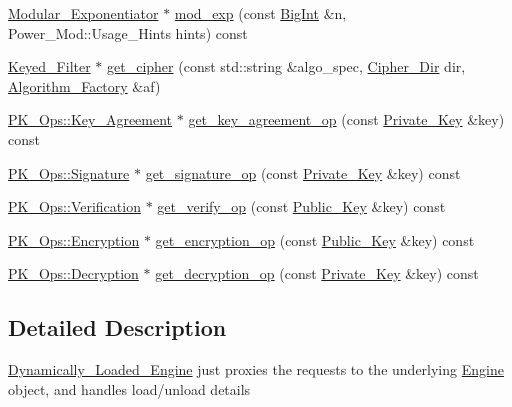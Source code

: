 \begin{DoxyCompactItemize}
\item 
\hyperlink{classBotan_1_1Modular__Exponentiator}{Modular\-\_\-\-Exponentiator} $\ast$ \hyperlink{classBotan_1_1Dynamically__Loaded__Engine_a759cf16bfc3f9f70b5e661e111d8608d}{mod\-\_\-exp} (const \hyperlink{classBotan_1_1BigInt}{Big\-Int} \&n, Power\-\_\-\-Mod\-::\-Usage\-\_\-\-Hints hints) const 
\item 
\hyperlink{classBotan_1_1Keyed__Filter}{Keyed\-\_\-\-Filter} $\ast$ \hyperlink{classBotan_1_1Dynamically__Loaded__Engine_a742a56b8bcf169bb028579279c7fba0d}{get\-\_\-cipher} (const std\-::string \&algo\-\_\-spec, \hyperlink{namespaceBotan_ad9d14ffdc73fc19966421979b32ee759}{Cipher\-\_\-\-Dir} dir, \hyperlink{classBotan_1_1Algorithm__Factory}{Algorithm\-\_\-\-Factory} \&af)
\item 
\hyperlink{classBotan_1_1PK__Ops_1_1Key__Agreement}{P\-K\-\_\-\-Ops\-::\-Key\-\_\-\-Agreement} $\ast$ \hyperlink{classBotan_1_1Dynamically__Loaded__Engine_a52c40f10df18618fbde1f77166aa85eb}{get\-\_\-key\-\_\-agreement\-\_\-op} (const \hyperlink{classBotan_1_1Private__Key}{Private\-\_\-\-Key} \&key) const 
\item 
\hyperlink{classBotan_1_1PK__Ops_1_1Signature}{P\-K\-\_\-\-Ops\-::\-Signature} $\ast$ \hyperlink{classBotan_1_1Dynamically__Loaded__Engine_aa226d36b7beac90741a0b4360de211aa}{get\-\_\-signature\-\_\-op} (const \hyperlink{classBotan_1_1Private__Key}{Private\-\_\-\-Key} \&key) const 
\item 
\hyperlink{classBotan_1_1PK__Ops_1_1Verification}{P\-K\-\_\-\-Ops\-::\-Verification} $\ast$ \hyperlink{classBotan_1_1Dynamically__Loaded__Engine_a7e733d4b080d211e2254ed89740679e5}{get\-\_\-verify\-\_\-op} (const \hyperlink{classBotan_1_1Public__Key}{Public\-\_\-\-Key} \&key) const 
\item 
\hyperlink{classBotan_1_1PK__Ops_1_1Encryption}{P\-K\-\_\-\-Ops\-::\-Encryption} $\ast$ \hyperlink{classBotan_1_1Dynamically__Loaded__Engine_ab65bebf19a2519238f8927a900570caf}{get\-\_\-encryption\-\_\-op} (const \hyperlink{classBotan_1_1Public__Key}{Public\-\_\-\-Key} \&key) const 
\item 
\hyperlink{classBotan_1_1PK__Ops_1_1Decryption}{P\-K\-\_\-\-Ops\-::\-Decryption} $\ast$ \hyperlink{classBotan_1_1Dynamically__Loaded__Engine_a46166e633cba2cef57081ce064cdc0ac}{get\-\_\-decryption\-\_\-op} (const \hyperlink{classBotan_1_1Private__Key}{Private\-\_\-\-Key} \&key) const 
\end{DoxyCompactItemize}


\subsection{Detailed Description}
\hyperlink{classBotan_1_1Dynamically__Loaded__Engine}{Dynamically\-\_\-\-Loaded\-\_\-\-Engine} just proxies the requests to the underlying \hyperlink{classBotan_1_1Engine}{Engine} object, and handles load/unload details 

